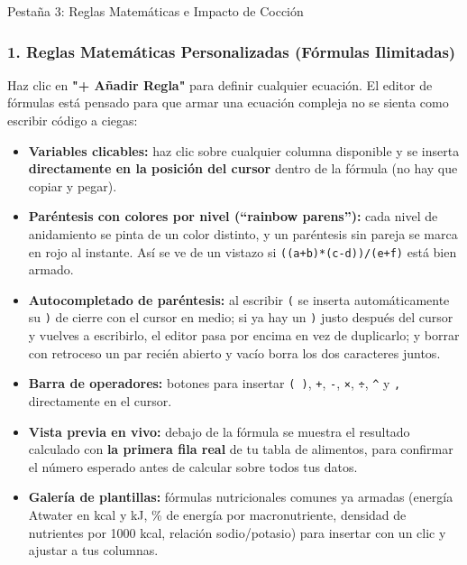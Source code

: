 \documentclass[11pt,a4paper]{article}
\begin{document}
\begin{stepcard}{Pestaña 3: Reglas Matemáticas e Impacto de Cocción}

\subsubsection*{1. Reglas Matemáticas Personalizadas (Fórmulas Ilimitadas)}
Haz clic en \textbf{"+ Añadir Regla"} para definir cualquier ecuación. El editor de fórmulas está pensado para que armar una ecuación compleja no se sienta como escribir código a ciegas:

\begin{itemize}[label=\textcolor{aeroemerald}{$\checkmark$}]
    \item \textbf{Variables clicables:} haz clic sobre cualquier columna disponible y se inserta \textbf{directamente en la posición del cursor} dentro de la fórmula (no hay que copiar y pegar).
    \item \textbf{Paréntesis con colores por nivel (``rainbow parens''):} cada nivel de anidamiento se pinta de un color distinto, y un paréntesis sin pareja se marca en rojo al instante. Así se ve de un vistazo si \texttt{((a+b)*(c-d))/(e+f)} está bien armado.
    \item \textbf{Autocompletado de paréntesis:} al escribir \texttt{(} se inserta automáticamente su \texttt{)} de cierre con el cursor en medio; si ya hay un \texttt{)} justo después del cursor y vuelves a escribirlo, el editor pasa por encima en vez de duplicarlo; y borrar con retroceso un par recién abierto y vacío borra los dos caracteres juntos.
    \item \textbf{Barra de operadores:} botones para insertar \texttt{( )}, \texttt{+}, \texttt{-}, \texttt{×}, \texttt{÷}, \texttt{\^{}} y \texttt{,} directamente en el cursor.
    \item \textbf{Vista previa en vivo:} debajo de la fórmula se muestra el resultado calculado con \textbf{la primera fila real} de tu tabla de alimentos, para confirmar el número esperado antes de calcular sobre todos tus datos.
    \item \textbf{Galería de plantillas:} fórmulas nutricionales comunes ya armadas (energía Atwater en kcal y kJ, \% de energía por macronutriente, densidad de nutrientes por 1000 kcal, relación sodio/potasio) para insertar con un clic y ajustar a tus columnas.
\end{itemize}


\end{stepcard}
\end{document}
